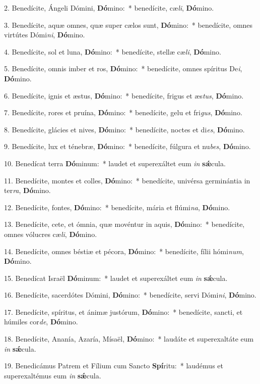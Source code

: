 
2. Benedícite, Ángeli Dómini, \textbf{Dó}mino:~* benedícite, cæ\textit{li}, \textbf{Dó}mino.

3. Benedícite, aquæ omnes, quæ super cælos sunt, \textbf{Dó}mino:~* benedícite, omnes virtútes Dómi\textit{ni}, \textbf{Dó}mino.

4. Benedícite, sol et luna, \textbf{Dó}mino:~* benedícite, stellæ cæ\textit{li}, \textbf{Dó}mino.

5. Benedícite, omnis imber et ros, \textbf{Dó}mino:~* benedícite, omnes spíritus De\textit{i}, \textbf{Dó}mino.

6. Benedícite, ignis et æstus, \textbf{Dó}mino:~* benedícite, frigus et æs\textit{tus}, \textbf{Dó}mino.

7. Benedícite, rores et pruína, \textbf{Dó}mino:~* benedícite, gelu et fri\textit{gus}, \textbf{Dó}mino.

8. Benedícite, glácies et nives, \textbf{Dó}mino:~* benedícite, noctes et di\textit{es}, \textbf{Dó}mino.

9. Benedícite, lux et ténebræ, \textbf{Dó}mino:~* benedícite, fúlgura et nu\textit{bes}, \textbf{Dó}mino.

10. Benedícat terra \textbf{Dó}minum:~* laudet et superexáltet eum \textit{in} \textbf{s\'{\ae}}cula.

11. Benedícite, montes et colles, \textbf{Dó}mino:~* benedícite, univérsa germinántia in ter\textit{ra}, \textbf{Dó}mino.

12. Benedícite, fontes, \textbf{Dó}mino:~* benedícite, mária et flúmi\textit{na}, \textbf{Dó}mino.

13. Benedícite, cete, et ómnia, quæ movéntur in aquis, \textbf{Dó}mino:~* benedícite, omnes vólucres cæ\textit{li}, \textbf{Dó}mino.

14. Benedícite, omnes béstiæ et pécora, \textbf{Dó}mino:~* benedícite, fílii hómi\textit{num}, \textbf{Dó}mino.

15. Benedícat Israël \textbf{Dó}minum:~* laudet et superexáltet eum \textit{in} \textbf{s\'{\ae}}cula.

16. Benedícite, sacerdótes Dómini, \textbf{Dó}mino:~* benedícite, servi Dómi\textit{ni}, \textbf{Dó}mino.

17. Benedícite, spíritus, et ánimæ justórum, \textbf{Dó}mino:~* benedícite, sancti, et húmiles cor\textit{de}, \textbf{Dó}mino.

18. Benedícite, Ananía, Azaría, Mísaël, \textbf{Dó}mino:~* laudáte et superexaltáte eum \textit{in} \textbf{s\'{\ae}}cula.

19. Benedicámus Patrem et Fílium cum Sancto \textbf{Spí}ritu:~* laudémus et superexaltémus eum \textit{in} \textbf{s\'{\ae}}cula.